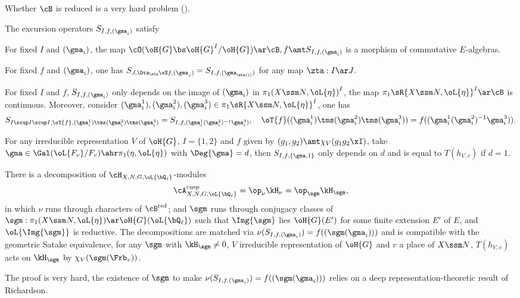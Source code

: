 \documentclass[article, a4paper, twoside]{universal}
\begin{document}
\begin{rmk}
	Whether $\cB$ is reduced is a very hard problem (\cite[Conjecture~12.12]{Lafforgue2018Chtoucas}).
\end{rmk}

\begin{thm}
	The excursion operators $S_{I,f,(\gma_{i})}$ satisfy
	\begin{itm}
		\item For fixed $I$ and $(\gma_{i})$, the map $\cO(\oH{G}\bs\oH{G}^{I}/\oH{G})\ar\cB,f\amt S_{I,f,(\gma_{i})}$ is a morphism of commutative $E$-algebras.
		\item For fixed $f$ and $(\gma_{i})$, one has $S_{J,\Dta_{\zta}\xS f,(\gma_{j})}=S_{I,f,(\gma_{\zta(i)})}$ for any map $\zta:I\ar J$.
		\item For fixed $I$ and $f$, $S_{I,f,(\gma_{i})}$ only depends on the image of $(\gma_{i})$ in $\pi_{1}{(X\ssm N,\oL{\eta})}^{I}$, the map $\pi_{1}\sR{X\ssm N, \oL{\eta}}^{I}\ar\cB$ is continuous. Moreover, consider $(\gma_{i}^{1}),(\gma_{i}^{2}),(\gma_{i}^{3})\in\pi_{1}\sR{X\ssm N,\oL{\eta}}^{I}$, one has
			\[
				S_{I\scup I\scup I,\oT{f},(\gma_{i}^{1})\tms(\gma_{i}^{2})\tms(\gma_{i}^{3})}=S_{I,f,(\gma_{i}^{1}(\gma_{i}^{2})^{-1}\gma_{i}^{3})},\quad \oT{f}((\gma_{i}^{1})\tms(\gma_{i}^{2})\tms(\gma_{i}^{3}))=f((\gma_{i}^{1}(\gma_{i}^{2})^{-1}\gma_{i}^{3})).
			\]
		\item For any irreducible representation $V$ of $\oH{G}$, $I=\{1,2\}$ and $f$ given by $(g_{1},g_{2})\amt\chi_{V}(g_{1}g_{2}\xI)$, take $\gma\in\Gal(\oL{F_{v}}/F_{v})\ahr\pi_{1}(\eta,\oL{\eta})$ with $\Deg{\gma}=d$, then $S_{I,f,\{\gma,1\}}$ only depends on $d$ and is equal to $T(h_{V,v})$ if $d=1$.
	\end{itm}
\end{thm}



\begin{thm}
	There is a decomposition of $\cH_{X,N,G,\oL{\bQ_{\ell}}}$-modules
	\[
		\cA_{X,N,G,\oL{\bQ_{\ell}}}^{\text{cusp}}=\op_{\nu}\kH_{\nu}=\op_{\sgm}\kH_{\sgm},
	\]
	in which $\nu$ runs through characters of $\cB^{\text{red}}$; and $\sgm$ runs through conjugacy classes of $\sgm:\pi_{1}(X\ssm N,\oL{\eta})\ar\oH{G}(\oL{\bQ_{\ell}})$ such that $\Img{\sgm}$ lies $\oH{G}(E')$ for some finite extension $E'$ of $E$, and $\oL{\Img{\sgm}}$ is reductive. The decompositions are matched via $\nu(S_{I,f,(\gma_{i})})=f((\sgm(\gma_{i})))$ and is compatible with the geometric Satake equivalence, for any $\sgm$ with $\kH_{\sgm}\neq0$, $V$ irreducible representation of $\oH{G}$ and $v$ a place of $X\ssm N$, $T(h_{V,v})$ acts on $\kH_{\sgm}$ by $\chi_{V}(\sgm(\Frb_{v}))$.
\end{thm}

\begin{rmk}
	The proof is very hard, the existence of $\sgm$ to make $\nu(S_{I,f,(\gma_{i})})=f((\sgm(\gma_{i})))$ relies on a deep representation-theoretic result of Richardson\cite{Richardson1988}.
\end{rmk}


\printref
\end{document}
